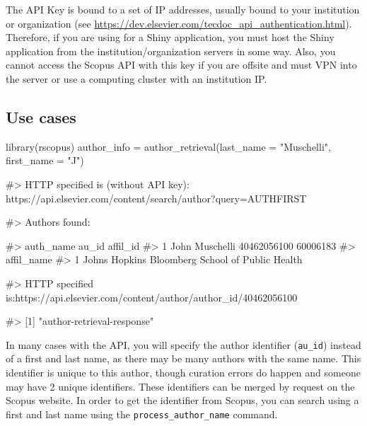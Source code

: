 The API Key is bound to a set of IP addresses, usually bound to your
institution or organization (see
\url{https://dev.elsevier.com/tecdoc_api_authentication.html}).
Therefore, if you are using  for a Shiny application, you
must host the Shiny application from the institution/organization
servers in some way. Also, you cannot access the Scopus API with this
key if you are offsite and must VPN into the server or use a computing
cluster with an institution IP.

\hypertarget{use-cases}{%
\subsection{Use cases}\label{use-cases}}

\begin{Schunk}
\begin{Sinput}
library(rscopus)
author_info = author_retrieval(last_name = "Muschelli", first_name = "J")
\end{Sinput}
\begin{Soutput}
#> HTTP specified is (without API key): https://api.elsevier.com/content/search/author?query=AUTHFIRST%
\end{Soutput}
\begin{Soutput}
#> Authors found:
\end{Soutput}
\begin{Soutput}
#>        auth_name       au_id affil_id
#> 1 John Muschelli 40462056100 60006183
#>                                        affil_name
#> 1 Johns Hopkins Bloomberg School of Public Health
\end{Soutput}
\begin{Soutput}
#> HTTP specified is:https://api.elsevier.com/content/author/author_id/40462056100
\end{Soutput}
\begin{Soutput}
#> [1] "author-retrieval-response"
\end{Soutput}
\end{Schunk}

In many cases with the API, you will specify the author identifier
(\texttt{au\_id}) instead of a first and last name, as there may be many
authors with the same name. This identifier is unique to this author,
though curation errors do happen and someone may have 2 unique
identifiers. These identifiers can be merged by request on the Scopus
website. In order to get the identifier from Scopus, you can search
using a first and last name using the \texttt{process\_author\_name}
command.

